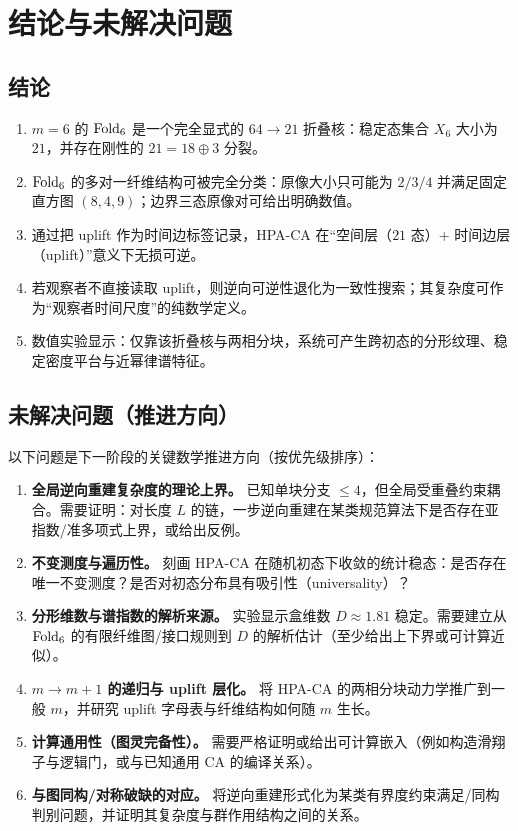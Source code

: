 
\section{结论与未解决问题}

\subsection{结论}

\begin{enumerate}
  \item $m=6$ 的 $\mathrm{Fold}_6$ 是一个完全显式的 $64\to 21$ 折叠核：稳定态集合 $X_6$ 大小为 $21$，并存在刚性的 $21=18\oplus 3$ 分裂。
  \item $\mathrm{Fold}_6$ 的多对一纤维结构可被完全分类：原像大小只可能为 $2/3/4$ 并满足固定直方图 $(8,4,9)$；边界三态原像对可给出明确数值。
  \item 通过把 uplift 作为时间边标签记录，HPA-CA 在“空间层（$21$ 态）+ 时间边层（uplift）”意义下无损可逆。
  \item 若观察者不直接读取 uplift，则逆向可逆性退化为一致性搜索；其复杂度可作为“观察者时间尺度”的纯数学定义。
  \item 数值实验显示：仅靠该折叠核与两相分块，系统可产生跨初态的分形纹理、稳定密度平台与近幂律谱特征。
\end{enumerate}

\subsection{未解决问题（推进方向）}

以下问题是下一阶段的关键数学推进方向（按优先级排序）：
\begin{enumerate}
  \item \textbf{全局逆向重建复杂度的理论上界。} 已知单块分支 $\le 4$，但全局受重叠约束耦合。需要证明：对长度 $L$ 的链，一步逆向重建在某类规范算法下是否存在亚指数/准多项式上界，或给出反例。
  \item \textbf{不变测度与遍历性。} 刻画 HPA-CA 在随机初态下收敛的统计稳态：是否存在唯一不变测度？是否对初态分布具有吸引性（universality）？
  \item \textbf{分形维数与谱指数的解析来源。} 实验显示盒维数 $D\approx 1.81$ 稳定。需要建立从 $\mathrm{Fold}_6$ 的有限纤维图/接口规则到 $D$ 的解析估计（至少给出上下界或可计算近似）。
  \item \textbf{$m\to m+1$ 的递归与 uplift 层化。} 将 HPA-CA 的两相分块动力学推广到一般 $m$，并研究 uplift 字母表与纤维结构如何随 $m$ 生长。
  \item \textbf{计算通用性（图灵完备性）。} 需要严格证明或给出可计算嵌入（例如构造滑翔子与逻辑门，或与已知通用 CA 的编译关系）。
  \item \textbf{与图同构/对称破缺的对应。} 将逆向重建形式化为某类有界度约束满足/同构判别问题，并证明其复杂度与群作用结构之间的关系。
\end{enumerate}

